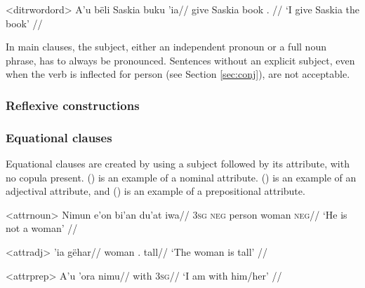 \documentclass[../hewa_main-subfiles.tex]{subfiles}
\begin{document}
\ex<ditrwordord>
\begingl %
\gla A'u bëli Saskia buku 'ia//
\glb \First{}\Sg{} give Saskia book \Def{}.\Sg{} //
\glft `I give Saskia the book' // 
\endgl
\xe 

In main clauses, the subject, either an independent pronoun or a full noun phrase, has to always be pronounced. Sentences without an explicit subject, even when the verb is inflected for person (see Section \ref{sec:conj}), are not acceptable.



\subsubsection{Reflexive constructions}

\subsubsection{Equational clauses}

Equational clauses are created by using a subject followed by its attribute, with no copula present. () is an example of a nominal attribute. () is an example of an adjectival attribute, and () is an example of a prepositional attribute. 



\ex<attrnoun>
\begingl %
\gla Nimun e'on bi'an du'at iwa//
\glb \textsc{3sg} \textsc{neg} person woman \textsc{neg}//
\glft `He is not a woman' // 
\endgl %
\xe 

\ex<attradj>
\begingl %
 'ia gëhar//
\glb woman \Def{}.\Sg{} tall//
\glft `The woman is tall' // 
\endgl
\xe 

\ex<attrprep>
\begingl %
\gla A'u 'ora nimu//
\glb {\First{}\Sg{}} with \textsc{3sg}//
\glft `I am with him/her' // 
\endgl
\xe 
\end{document}
